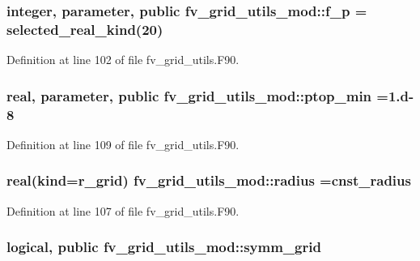 \subsubsection[{f\-\_\-p}]{\setlength{\rightskip}{0pt plus 5cm}integer, parameter, public fv\-\_\-grid\-\_\-utils\-\_\-mod\-::f\-\_\-p = selected\-\_\-real\-\_\-kind(20)}\label{classfv__grid__utils__mod_a72968a7b4fccc9953a595a4efe712cad}


Definition at line 102 of file fv\-\_\-grid\-\_\-utils.\-F90.

\subsubsection[{ptop\-\_\-min}]{\setlength{\rightskip}{0pt plus 5cm}real, parameter, public fv\-\_\-grid\-\_\-utils\-\_\-mod\-::ptop\-\_\-min =1.d-\/8}\label{classfv__grid__utils__mod_a8363bc8f261396e37744efbbfa91fb7d}


Definition at line 109 of file fv\-\_\-grid\-\_\-utils.\-F90.

\subsubsection[{radius}]{\setlength{\rightskip}{0pt plus 5cm}real(kind=r\-\_\-grid) fv\-\_\-grid\-\_\-utils\-\_\-mod\-::radius =cnst\-\_\-radius\hspace{0.3cm}{\ttfamily [private]}}\label{classfv__grid__utils__mod_a9825bfea45f13a48cc658a3df88d3124}


Definition at line 107 of file fv\-\_\-grid\-\_\-utils.\-F90.

\subsubsection[{symm\-\_\-grid}]{\setlength{\rightskip}{0pt plus 5cm}logical, public fv\-\_\-grid\-\_\-utils\-\_\-mod\-::symm\-\_\-grid}\label{classfv__grid__utils__mod_a5bf65a4c81568a1f4d7e893be47655a1}


